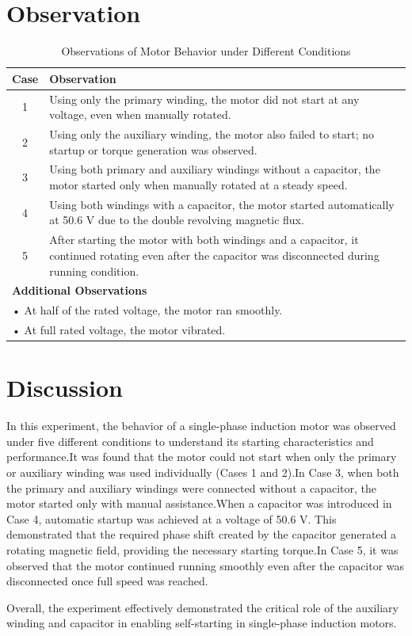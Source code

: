 \documentclass[a4paper,12pt]{article}
\begin{document}
	\section{Observation}
	\begin{table}[H]
		\centering
		\begin{tabular}{|c|p{12cm}|}
			\hline
			\textbf{Case} & \textbf{Observation} \\
			\hline
			1 & Using only the primary winding, the motor did not start at any voltage, even when manually rotated. \\
			\hline
			2 & Using only the auxiliary winding, the motor also failed to start; no startup or torque generation was observed. \\
			\hline
			3 & Using both primary and auxiliary windings without a capacitor, the motor started only when manually rotated at a steady speed. \\
			\hline
			4 & Using both windings with a capacitor, the motor started automatically at 50.6 V due to the double revolving magnetic flux. \\
			\hline
			5 & After starting the motor with both windings and a capacitor, it continued rotating even after the capacitor was disconnected during running condition. \\
			\hline
			\multicolumn{2}{|l|}{\textbf{Additional Observations}} \\
			\hline
			\multicolumn{2}{|l|}{• At half of the rated voltage, the motor ran smoothly.} \\
			\multicolumn{2}{|l|}{• At full rated voltage, the motor vibrated.} \\
			\hline
		\end{tabular}
		\caption{Observations of Motor Behavior under Different Conditions}
	\end{table}
	

	\section{Discussion}
	
	In this experiment, the behavior of a single-phase induction motor was observed under five different conditions to understand its starting characteristics and performance.It was found that the motor could not start when only the primary or auxiliary winding was used individually (Cases 1 and 2).In Case 3, when both the primary and auxiliary windings were connected without a capacitor, the motor started only with manual assistance.When a capacitor was introduced in Case 4, automatic startup was achieved at a voltage of 50.6 V. This demonstrated that the required phase shift created by the capacitor generated a rotating magnetic field, providing the necessary starting torque.In Case 5, it was observed that the motor continued running smoothly even after the capacitor was disconnected once full speed was reached. 
	

	
	Overall, the experiment effectively demonstrated the critical role of the auxiliary winding and capacitor in enabling self-starting in single-phase induction motors.
	
	

	
\end{document}

